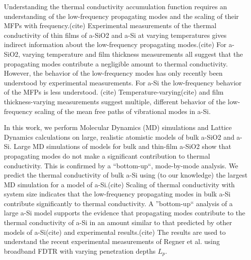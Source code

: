 \documentclass[aps,prb,onecolumn,preprint,superscriptaddress,footinbib,amsmath,amssymb,floatfix]{revtex4}
\begin{document}
Understanding the thermal conductivity accumulation function 
requires an understanding of the low-frequency propagating 
modes and the scaling of their MFPs with 
frequency.(cite) 
Experimental measurements of the thermal conductivity of
thin films of a-SiO2 and a-Si at varying temperatures 
gives indirect information about the low-frequency propagating 
modes.(cite) For a-SiO2, 
varying temperature 
and film thickness
\cite{lee_heat_1997,yamane_measurement_2002} 
measurements all suggest that the propagating modes 
contribute a negligible amount to thermal conductivity. 
However, the behavior of the low-frequency modes 
has only recently been understood by experimental 
measurements.
\cite{masciovecchio_evidence_2006,baldi_thermal_2008,
baldi_sound_2010,baldi_elastic_2011,baldi_emergence_2013} 
For a-Si the low-frequency behavior of the MFPs is less understood.
(cite) 
Temperature-varying(cite) and film thickness-varying measurements
\cite{pompe_thermal_1988,cahill_thermal_1989,hasselman_thermal_1989,
kuo_thermal_1992,feldman_thermal_1993,cahill_thermal_1994,
wada_thermal_1996,feldman_numerical_1999,
moon_thermal_2002,zink_thermal_2006,zink_excess_2006,liu_high_2009,
yang_anomalously_2010}
suggest multiple, different behavior of the low-frequency 
scaling of the mean free paths of vibrational modes in a-Si. 

In this work, we perform Molecular Dynamics (MD) simulations and 
Lattice Dynamics calculations on large, realistic atomistic models 
of bulk a-SiO2 and a-Si. Large MD 
simulations of models for bulk and thin-film a-SiO2 show that 
propagating modes 
do not make a significant contribution to thermal conductivity. 
This is confirmed by a ``bottom-up``, mode-by-mode analysis.  
We predict the thermal conductivity of bulk a-Si using (to our 
knowledge) the largest MD simulation for a model of a-Si.(cite) 
Scaling 
of thermal conductivity with system size indicates that the 
low-frequency propagating modes in bulk a-Si contribute significantly 
to thermal conductivity. 
A ''bottom-up`` analysis of a large a-Si model supports the evidence 
that propagating 
modes contribute to the thermal 
conductivity of a-Si in an amount similar to that predicted by 
other models of a-Si(cite) and experimental results.(cite) 
The results are used to 
understand the recent experimental measurements of Regner et al. 
using broadband FDTR with varying 
penetration depths $L_p$.\cite{regner_broadband_2013}
\end{document}
